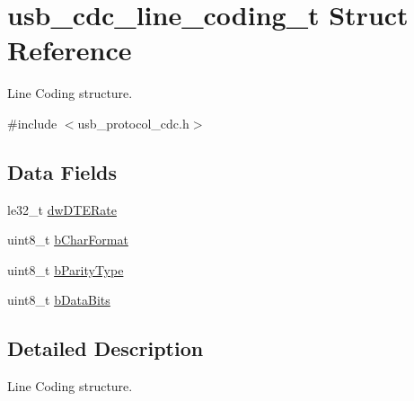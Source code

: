 \hypertarget{structusb__cdc__line__coding__t}{
\section{usb\-\_\-cdc\-\_\-line\-\_\-coding\-\_\-t \-Struct \-Reference}
\label{structusb__cdc__line__coding__t}
}


\-Line \-Coding structure.  




{\ttfamily \#include $<$usb\-\_\-protocol\-\_\-cdc.\-h$>$}

\subsection*{\-Data \-Fields}
\begin{DoxyCompactItemize}
\item 
le32\-\_\-t \hyperlink{structusb__cdc__line__coding__t_ab49d8ed399997154486fa93af54f02c2}{dw\-D\-T\-E\-Rate}
\item 
uint8\-\_\-t \hyperlink{structusb__cdc__line__coding__t_a7c8e804c8fc957f5a491c087ea35ea99}{b\-Char\-Format}
\item 
uint8\-\_\-t \hyperlink{structusb__cdc__line__coding__t_ab7d9dd2aa31399d37950a840d24b9026}{b\-Parity\-Type}
\item 
uint8\-\_\-t \hyperlink{structusb__cdc__line__coding__t_a37561226b9715655f328b565c641bbc2}{b\-Data\-Bits}
\end{DoxyCompactItemize}


\subsection{\-Detailed \-Description}
\-Line \-Coding structure. 

